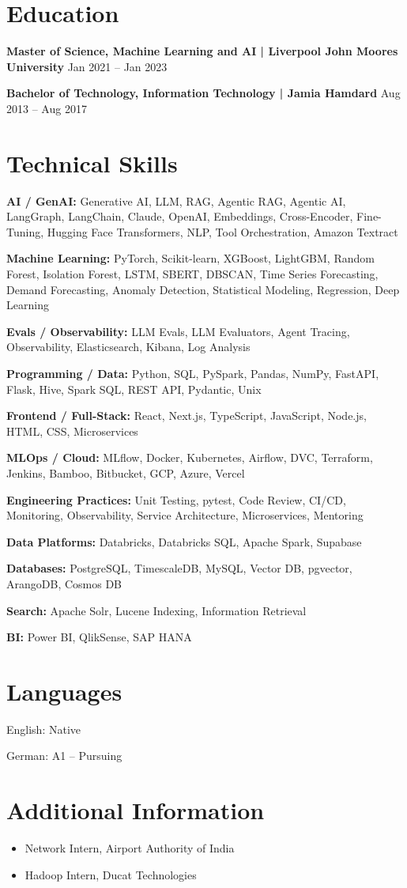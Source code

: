 \documentclass[10pt,a4paper]{article}
\begin{document}
\section{Education}
\textbf{Master of Science, Machine Learning and AI | Liverpool John Moores University} \hfill Jan 2021 -- Jan 2023\par
\textbf{Bachelor of Technology, Information Technology | Jamia Hamdard} \hfill Aug 2013 -- Aug 2017\par

\section{Technical Skills}
\textbf{AI / GenAI:} Generative AI, LLM, RAG, Agentic RAG, Agentic AI, LangGraph, LangChain, Claude, OpenAI, Embeddings, Cross-Encoder, Fine-Tuning, Hugging Face Transformers, NLP, Tool Orchestration, Amazon Textract\par
\textbf{Machine Learning:} PyTorch, Scikit-learn, XGBoost, LightGBM, Random Forest, Isolation Forest, LSTM, SBERT, DBSCAN, Time Series Forecasting, Demand Forecasting, Anomaly Detection, Statistical Modeling, Regression, Deep Learning\par
\textbf{Evals / Observability:} LLM Evals, LLM Evaluators, Agent Tracing, Observability, Elasticsearch, Kibana, Log Analysis\par
\textbf{Programming / Data:} Python, SQL, PySpark, Pandas, NumPy, FastAPI, Flask, Hive, Spark SQL, REST API, Pydantic, Unix\par
\textbf{Frontend / Full-Stack:} React, Next.js, TypeScript, JavaScript, Node.js, HTML, CSS, Microservices\par
\textbf{MLOps / Cloud:} MLflow, Docker, Kubernetes, Airflow, DVC, Terraform, Jenkins, Bamboo, Bitbucket, GCP, Azure, Vercel\par
\textbf{Engineering Practices:} Unit Testing, pytest, Code Review, CI/CD, Monitoring, Observability, Service Architecture, Microservices, Mentoring\par
\textbf{Data Platforms:} Databricks, Databricks SQL, Apache Spark, Supabase\par
\textbf{Databases:} PostgreSQL, TimescaleDB, MySQL, Vector DB, pgvector, ArangoDB, Cosmos DB\par
\textbf{Search:} Apache Solr, Lucene Indexing, Information Retrieval\par
\textbf{BI:} Power BI, QlikSense, SAP HANA\par

\section{Languages}
English: Native\par
German: A1 -- Pursuing\par

\section{Additional Information}
\begin{itemize}
  \item Network Intern, Airport Authority of India
  \item Hadoop Intern, Ducat Technologies
\end{itemize}
\end{document}
